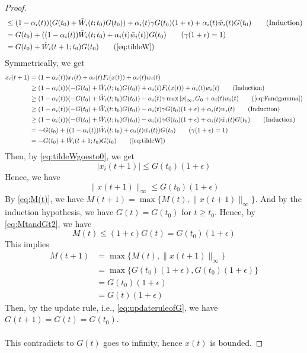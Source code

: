 \begin{proof}
\begin{align*}
    &\le (1-\alpha_i(t))(G(t_0) + \tilde W_i(t;t_0)G(t_0)) + \alpha_i(t)\gamma G(t_0)(1+\epsilon)+ \alpha_i(t)\tilde w_i(t)G(t_0)\tag{Induction}\\
    & = G(t_0) + ((1-\alpha_i(t))\tilde W_i(t;t_0)+\alpha_i(t)\tilde w_i(t))G(t_0)\tag{$\gamma(1+\epsilon)=1$}\\
    & = G(t_0)+ \tilde W_i(t+1;t_0)G(t_0) \tag{\autoref{eq:tildeW}}
\end{align*}
Symmetrically, we get
\begin{align*}
x_i(t+1) &= (1-\alpha_i(t))x_i(t) + \alpha_i(t)F_i(x(t)) + \alpha_i(t)w_i(t)\\
&\geq (1-\alpha_i(t))(-G(t_0) + \tilde W_i(t;t_0)G(t_0)) + \alpha_i(t)F_i(x(t)) + \alpha_i(t)w_i(t)\tag{Induction}\\
&\geq (1-\alpha_i(t))(-G(t_0) + \tilde W_i(t;t_0)G(t_0)) - \alpha_i(t)\gamma\max{|x|_\infty,G_0} + \alpha_i(t)w_i(t)\tag{\autoref{eq:Fandgamma}}\\
&\geq (1-\alpha_i(t))(-G(t_0) + \tilde W_i(t;t_0)G(t_0)) - \alpha_i(t)\gamma G(t_0)(1+\epsilon)+ \alpha_i(t)w_i(t)\tag{Induction}\\
&\geq (1-\alpha_i(t))(-G(t_0) + \tilde W_i(t;t_0)G(t_0)) - \alpha_i(t)\gamma G(t_0)(1+\epsilon)+ \alpha_i(t)\tilde w_i(t)G(t_0)\tag{Induction}\\
& = -G(t_0) + ((1-\alpha_i(t))\tilde W_i(t;t_0)+\alpha_i(t)\tilde w_i(t))G(t_0)\tag{$\gamma(1+\epsilon)=1$}\\
& = -G(t_0)+ \tilde W_i(t+1;t_0)G(t_0) \tag{\autoref{eq:tildeW}}
\end{align*}
Then, by \autoref{eq:tildeWgoesto0}, we get
$$
|x_i(t+1)|\le G(t_0)(1+\epsilon)
$$
Hence, we have
$$
\|x(t+1)\|_\infty \le G(t_0)(1+\epsilon)
$$
By \autoref{eq:M(t)}, we have $M(t+1) = \max\{M(t), \|x(t+1)\|_\infty\}$. And by the induction hypothesis, we have $G(t) = G(t_0)$ for $t\ge t_0$. Hence, by \autoref{eq:MtandGt2}, we have
$$
M(t) \le (1+\epsilon)G(t) = G(t_0)(1+\epsilon)
$$
This implies
\begin{align*}
    M(t+1) &= \max\{M(t),\|x(t+1)\|_\infty\}\\
    &= \max\{G(t_0)(1+\epsilon), G(t_0)(1+\epsilon)\}\\
    &= G(t_0)(1+\epsilon)\\
    & = G(t)(1+\epsilon)
\end{align*}
Then, by the update rule, i.e., \autoref{eq:updateruleofG}, we have $G(t+1) = G(t) = G(t_0)$.\\
\\
This contradicts to $G(t)$ goes to infinity, hence $x(t)$ is bounded.
\end{proof}

